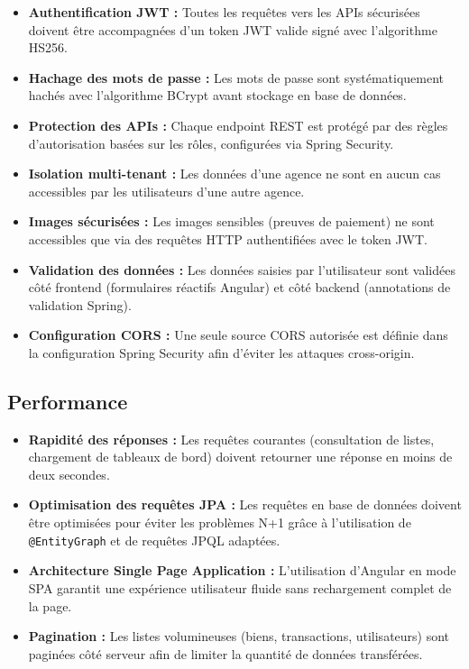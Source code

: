 \documentclass[a4paper,12pt]{report}
\begin{document}
\begin{itemize}
    \item \textbf{Authentification JWT :} Toutes les requêtes vers les APIs sécurisées doivent être accompagnées d'un token JWT valide signé avec l'algorithme HS256.
    \item \textbf{Hachage des mots de passe :} Les mots de passe sont systématiquement hachés avec l'algorithme BCrypt avant stockage en base de données.
    \item \textbf{Protection des APIs :} Chaque endpoint REST est protégé par des règles d'autorisation basées sur les rôles, configurées via Spring Security.
    \item \textbf{Isolation multi-tenant :} Les données d'une agence ne sont en aucun cas accessibles par les utilisateurs d'une autre agence.
    \item \textbf{Images sécurisées :} Les images sensibles (preuves de paiement) ne sont accessibles que via des requêtes HTTP authentifiées avec le token JWT.
    \item \textbf{Validation des données :} Les données saisies par l'utilisateur sont validées côté frontend (formulaires réactifs Angular) et côté backend (annotations de validation Spring).
    \item \textbf{Configuration CORS :} Une seule source CORS autorisée est définie dans la configuration Spring Security afin d'éviter les attaques cross-origin.
\end{itemize}

\subsection{Performance}

\begin{itemize}
    \item \textbf{Rapidité des réponses :} Les requêtes courantes (consultation de listes, chargement de tableaux de bord) doivent retourner une réponse en moins de deux secondes.
    \item \textbf{Optimisation des requêtes JPA :} Les requêtes en base de données doivent être optimisées pour éviter les problèmes N+1 grâce à l'utilisation de \texttt{@EntityGraph} et de requêtes JPQL adaptées.
    \item \textbf{Architecture Single Page Application :} L'utilisation d'Angular en mode SPA garantit une expérience utilisateur fluide sans rechargement complet de la page.
    \item \textbf{Pagination :} Les listes volumineuses (biens, transactions, utilisateurs) sont paginées côté serveur afin de limiter la quantité de données transférées.
\end{itemize}
\end{document}
